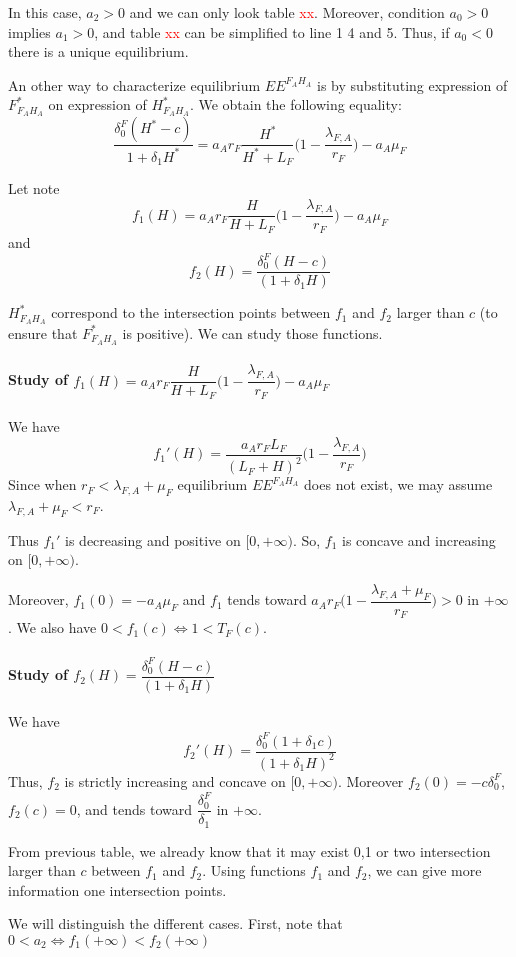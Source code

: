 \documentclass{article}
\newcommand{\lfa}{\lambda_{F, A}}
\newcommand{\df}{\delta_0^F}
\newcommand{\marc}[1]{\textcolor{red}{#1}}
\begin{document}
\begin{appendices}
In this case, $a_2 > 0$ and we can only look table \marc{xx}. Moreover, condition $a_0 > 0$ implies $a_1 > 0$, and table \marc{xx} can be simplified to line 1 4 and 5. Thus, if $a_0 < 0$ there is a unique equilibrium.


An other way to characterize equilibrium $EE^{F_AH_A}$ is by substituting expression of $F^*_{F_AH_A}$ on expression of $H^*_{F_AH_A}$. We obtain the following equality:
\begin{equation}
\dfrac{\df (H^* - c)}{1+ \delta_1 H^*} = a_A r_F \dfrac{H^*}{H^*+L_F} \Big(1 - \dfrac{\lfa}{r_F}\Big) - a_A \mu_F
\end{equation}

Let note 
$$f_1(H) = a_A r_F\dfrac{H}{H + L_F} \Big(1 - \dfrac{\lfa}{r_F}\Big) - a_A \mu_F$$
and
$$
f_2(H) = \dfrac{\df (H-c)}{(1 + \delta_1 H)}
$$

$H^*_{F_AH_A}$ correspond to the intersection points between $f_1$ and $f_2$ larger than $c$ (to ensure that $F^*_{F_AH_A}$ is positive). We can study those functions.


\paragraph*{Study of $f_1(H) = a_A r_F\dfrac{H}{H + L_F} \Big(1 - \dfrac{\lfa}{r_F}\Big) - a_A \mu_F$}
We have 
$$
f_1'(H) = \dfrac{a_A r_F  L_F}{(L_F + H)^2}\Big(1 - \dfrac{\lfa}{r_F}\Big)
$$
Since when $r_F < \lfa + \mu_F$ equilibrium $EE^{F_AH_A}$ does not exist, we may assume $\lfa + \mu_F < r_F$. 

Thus $f_1'$ is decreasing and positive on $[0, +\infty)$. So, $f_1$ is concave and increasing on $[0, + \infty)$.

Moreover,  $f_1(0) = - a_A \mu_F$ and $f_1$ tends toward $a_A r_F \Big(1 - \dfrac{\lfa + \mu_F}{r_F}\Big) > 0$ in $+\infty$. We also have $0 < f_1(c) \Leftrightarrow 1 < T_F(c)$.

\paragraph*{Study of $f_2(H) = \dfrac{\df (H-c)}{(1 + \delta_1 H)}$}
We have
$$
f_2'(H) = \dfrac{\df (1 + \delta_1 c)}{(1 + \delta_1 H)^2}
$$
Thus, $f_2$ is strictly increasing and concave on $[0, +\infty)$. Moreover $f_2(0) = - c \df$, $f_2(c) = 0$, and tends toward $\dfrac{\df}{ \delta_1}$ in $+ \infty$.


From previous table, we already know that it may exist 0,1 or two intersection larger than $c$ between $f_1$ and $f_2$. Using functions $f_1$ and $f_2$, we can give more information one intersection points. 

We will distinguish the different cases. First, note that $0 < a_2 \Leftrightarrow f_1(+\infty) < f_2(+\infty)$





\end{appendices}
\end{document}
